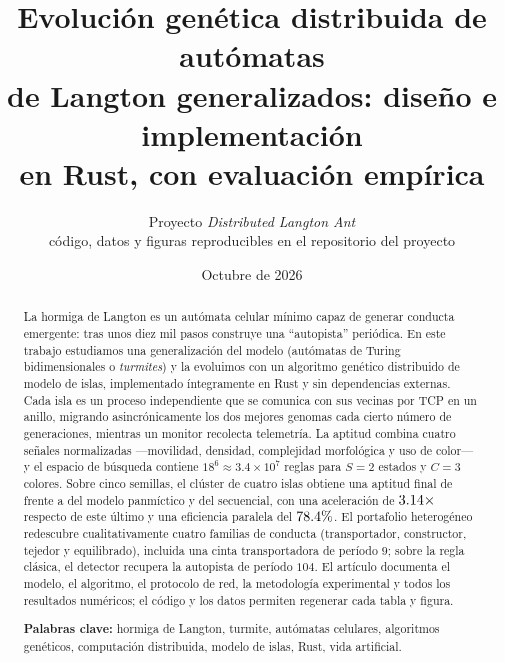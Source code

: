 \documentclass[11pt,a4paper]{article}
\title{\bfseries Evoluci\'on gen\'etica distribuida de aut\'omatas\\
de Langton generalizados: dise\~no e implementaci\'on\\
en Rust, con evaluaci\'on emp\'irica}
\author{Proyecto \emph{Distributed Langton Ant}\\[2pt]
\small c\'odigo, datos y figuras reproducibles en el repositorio del proyecto}
\date{Octubre de 2026}
\begin{document}
\maketitle

\begin{abstract}
\noindent
La hormiga de Langton es un aut\'omata celular m\'inimo capaz de generar
conducta emergente: tras unos diez mil pasos construye una ``autopista''
peri\'odica.  En este trabajo estudiamos una generalizaci\'on del modelo
(aut\'omatas de Turing bidimensionales o \emph{turmites}) y la evoluimos con un
algoritmo gen\'etico distribuido de modelo de islas, implementado \'integramente
en Rust y sin dependencias externas.  Cada isla es un proceso independiente que
se comunica con sus vecinas por TCP en un anillo, migrando asincr\'onicamente
los dos mejores genomas cada cierto n\'umero de generaciones, mientras un
monitor recolecta telemetr\'ia.  La aptitud combina cuatro se\~nales
normalizadas ---movilidad, densidad, complejidad morfol\'ogica y uso de
color--- y el espacio de b\'usqueda contiene $18^{6}\approx3.4\times10^{7}$
reglas para $S=2$ estados y $C=3$ colores.  Sobre cinco semillas, el cl\'uster de
cuatro islas obtiene una aptitud final de \FinalIsl{} frente a
\FinalPan{} del modelo panm\'ictico y \FinalSeq{} del secuencial, con una
aceleraci\'on de $3.14\times$ respecto de este \'ultimo y una eficiencia
paralela del $78.4\%$.  El portafolio heterog\'eneo redescubre
cualitativamente cuatro familias de conducta (transportador, constructor,
tejedor y equilibrado), incluida una cinta transportadora de per\'iodo $9$;
sobre la regla cl\'asica, el detector recupera la autopista de per\'iodo $104$.  El art\'iculo documenta el modelo, el algoritmo,
el protocolo de red, la metodolog\'ia experimental y todos los resultados
num\'ericos; el c\'odigo y los datos permiten regenerar cada tabla y figura.

\vspace{0.6em}
\noindent\textbf{Palabras clave:} hormiga de Langton, turmite, aut\'omatas
celulares, algoritmos gen\'eticos, computaci\'on distribuida, modelo de islas,
Rust, vida artificial.


\end{abstract}
\end{document}
